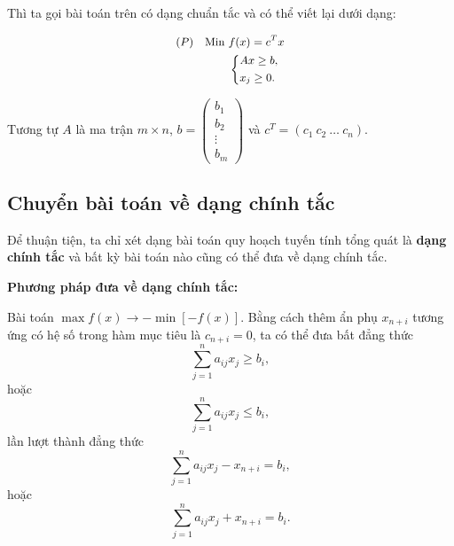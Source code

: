 \documentclass[12pt,a4paper]{report}
\begin{document}
    Thì ta gọi bài toán trên có dạng chuẩn tắc và có thể viết lại dưới dạng:

    \begin{equation} \small \label{F}
        \begin{split}
        (P) \quad \text{Min } & f(x) = c^Tx \\
            & \left\{
            \begin{split}
            & Ax \geq b, \\
            & x_j \geq 0.
            \end{split}
            \right.    
        \end{split}
    \end{equation}

    Tương tự $A$ là ma trận $m\times n$, $b=\begin{pmatrix}
        b_1 \\
        b_2 \\
        \vdots \\
        b_m
        \end{pmatrix}$ và $c^T=(c_1 \: c_2 \: \ldots \: c_n)$.



\subsection{Chuyển bài toán về dạng chính tắc}

Để thuận tiện, ta chỉ xét dạng bài toán quy hoạch tuyến tính tổng quát là \textbf{dạng chính tắc} và bất kỳ bài toán nào cũng có thể đưa về dạng chính tắc.


 \textbf{Phương pháp đưa về dạng chính tắc:}
    
     Bài toán $\max f(x) \longrightarrow -\min [-f(x)]$.
     Bằng cách thêm ẩn phụ $x_{n+i}$ tương ứng có hệ số trong hàm mục tiêu là $c_{n+i}=0$, ta có thể đưa bất đẳng thức 
    \begin{equation*}
    \sum _{j=1}^n a_{ij} x_j \geq b_i,
    \end{equation*}
    hoặc
    \begin{equation*}
    \sum _{j=1}^n a_{ij} x_j \leq b_i,
    \end{equation*}
    lần lượt thành đẳng thức
    \begin{equation*}
    \sum _{j=1}^n a_{ij} x_j - x_{n+i} = b_i,
    \end{equation*}
    hoặc
    \begin{equation*}
    \sum _{j=1}^n a_{ij} x_j + x_{n+i} = b_i.
    \end{equation*}
     
\end{document}
